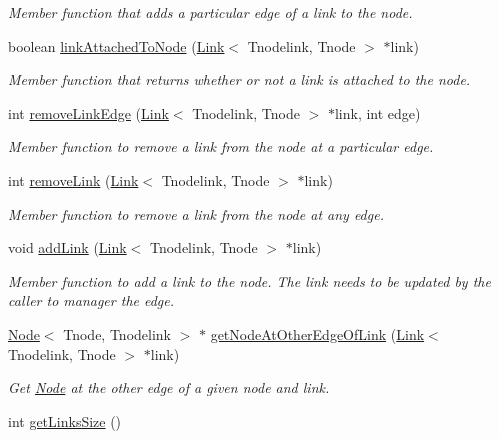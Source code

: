 \begin{DoxyCompactItemize}
\begin{DoxyCompactList}\small\item\em Member function that adds a particular edge of a link to the node. \end{DoxyCompactList}\item 
boolean \hyperlink{classNode_a9237bd16a22ee02c244d8cc95d6533bd}{link\+Attached\+To\+Node} (\hyperlink{classLink}{Link}$<$ Tnodelink, Tnode $>$ $\ast$link)
\begin{DoxyCompactList}\small\item\em Member function that returns whether or not a link is attached to the node. \end{DoxyCompactList}\item 
int \hyperlink{classNode_ad469f4b48294f360d372b5765eee4f77}{remove\+Link\+Edge} (\hyperlink{classLink}{Link}$<$ Tnodelink, Tnode $>$ $\ast$link, int edge)\hypertarget{classNode_ad469f4b48294f360d372b5765eee4f77}{}\label{classNode_ad469f4b48294f360d372b5765eee4f77}

\begin{DoxyCompactList}\small\item\em Member function to remove a link from the node at a particular edge. \end{DoxyCompactList}\item 
int \hyperlink{classNode_aa7a762ea839eea52e9d2cae7f31780e8}{remove\+Link} (\hyperlink{classLink}{Link}$<$ Tnodelink, Tnode $>$ $\ast$link)
\begin{DoxyCompactList}\small\item\em Member function to remove a link from the node at any edge. \end{DoxyCompactList}\item 
void \hyperlink{classNode_a2ecc65e8fb48f12bc4f1d12e9a71fb83}{add\+Link} (\hyperlink{classLink}{Link}$<$ Tnodelink, Tnode $>$ $\ast$link)
\begin{DoxyCompactList}\small\item\em Member function to add a link to the node. The link needs to be updated by the caller to manager the edge. \end{DoxyCompactList}\item 
\hyperlink{classNode}{Node}$<$ Tnode, Tnodelink $>$ $\ast$ \hyperlink{classNode_a807b982955efc34138a151f1080de5b4}{get\+Node\+At\+Other\+Edge\+Of\+Link} (\hyperlink{classLink}{Link}$<$ Tnodelink, Tnode $>$ $\ast$link)
\begin{DoxyCompactList}\small\item\em Get \hyperlink{classNode}{Node} at the other edge of a given node and link. \end{DoxyCompactList}\item 
int \hyperlink{classNode_acda1102824d095f6d56be041b3043615}{get\+Links\+Size} ()\hypertarget{classNode_acda1102824d095f6d56be041b3043615}{}\label{classNode_acda1102824d095f6d56be041b3043615}


\end{DoxyCompactItemize}
